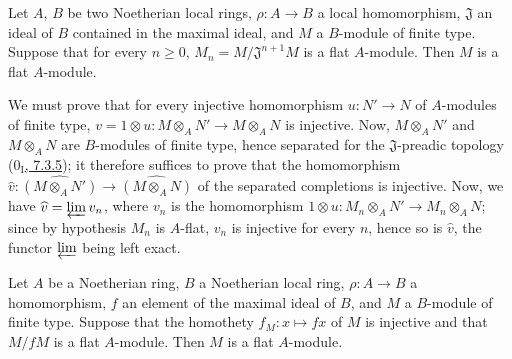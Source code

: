 \begin{proposition}[10.2.6]
\label{0.10.2.6}
Let $A$, $B$ be two Noetherian local rings, $\rho:A\to B$ a local
homomorphism, $\mathfrak{J}$ an ideal of $B$ contained in the maximal
ideal, and $M$ a $B$-module of finite type. Suppose that for every $n\geq0$,
$M_n=M/\mathfrak{J}^{n+1}M$ is a flat $A$-module. Then $M$ is a flat
$A$-module.
\end{proposition}

We must prove that for every injective homomorphism $u:N'\to N$ of
$A$-modules of finite type, $v=1\otimes u:M\otimes_A N'\to M\otimes_A N$ is
injective. Now, $M\otimes_A N'$ and $M\otimes_A N$ are $B$-modules of finite
type, hence separated for the $\mathfrak{J}$-preadic topology
(\hyperref[0.7.3.5]{$0_{\mathrm I}$, 7.3.5}); it therefore suffices to prove that
the homomorphism
$\widehat v:\widehat{(M\otimes_A N')}\to\widehat{(M\otimes_A N)}$ of the
separated completions is injective. Now, we have $\widehat v=\varprojlim v_n$, where
$v_n$ is the homomorphism $1\otimes u:M_n\otimes_A N'\to M_n\otimes_A N$;
since by hypothesis $M_n$ is $A$-flat, $v_n$ is injective for every $n$, hence
so is $\widehat v$, the functor $\varprojlim$ being left exact.

\begin{corollary}[10.2.7]
\label{0.10.2.7}
Let $A$ be a Noetherian ring, $B$ a Noetherian local ring,
$\rho:A\to B$ a homomorphism, $f$ an element of the maximal ideal of $B$, and $M$
a $B$-module of finite type. Suppose that the homothety
$f_M:x\mapsto fx$ of $M$ is injective and that $M/fM$ is a flat
$A$-module. Then $M$ is a flat $A$-module.
\end{corollary}


